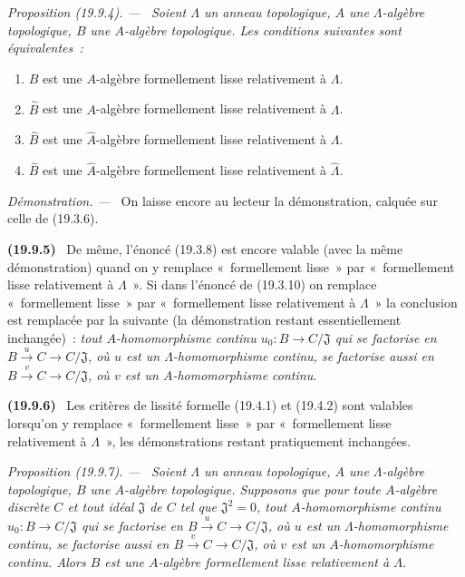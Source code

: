\documentclass[10pt,oneside]{book}
\makeatletter
\newcommand{\setmanualcurrentlabel}[1]{\def\@currentlabel{#1}}
\newcommand{\oldpage}[2][]{%
  \setcounter{footnote}{0}%
  \marginpar{\scriptsize\textbf{#1}~|~#2}\ignorespaces}
\newenvironment{env}[1][]{\setmanualcurrentlabel{#1}\par\medskip\noindent\textbf{(#1)}\ }{\par}
\newenvironment{proposition}[1][]{%
  \setmanualcurrentlabel{#1}\par\medskip\noindent\itshape Proposition (#1). ---\ }{\par}
\newenvironment{proof}{%
  \par\medskip\noindent\textit{Démonstration. ---\ }}{\par}
\makeatother
\begin{document}
\begin{proposition}[19.9.4]
\label{0.19.9.4-fr}
Soient $\Lambda$ un anneau topologique, $A$ une $\Lambda$-algèbre topologique,
$B$ une $A$-algèbre topologique. Les conditions suivantes sont équivalentes~:
\begin{enumerate}
  \item[a)] $B$ est une $A$-algèbre formellement lisse relativement à
  $\Lambda$.
  \item[b)] $\widehat B$ est une $A$-algèbre formellement lisse relativement à
  $\Lambda$.
  \item[c)] $\widehat B$ est une $\widehat A$-algèbre formellement lisse
  relativement à $\Lambda$.
  \item[d)] $\widehat B$ est une $\widehat A$-algèbre formellement lisse
  relativement à $\widehat\Lambda$.
\end{enumerate}
\end{proposition}

\begin{proof}
On laisse encore au lecteur la démonstration, calquée sur celle de (19.3.6).
\end{proof}

\oldpage[0\textsubscript{IV-1}]{115}

\begin{env}[19.9.5]
\label{0.19.9.5-fr}
De même, l'énoncé (19.3.8) est encore valable (avec la même démonstration) quand
on y remplace «~formellement lisse~» par «~formellement lisse relativement à
$\Lambda$~». Si dans l'énoncé de (19.3.10) on remplace «~formellement lisse~»
par «~formellement lisse relativement à $\Lambda$~» la conclusion est remplacée
par la suivante (la démonstration restant essentiellement inchangée)~: \emph{tout
$A$-homomorphisme continu $u_0:B\to C/\mathfrak J$ qui se factorise en
$B\xrightarrow{u}C\to C/\mathfrak J$, où $u$ est un $\Lambda$-homomorphisme
continu, se factorise aussi en $B\xrightarrow{v}C\to C/\mathfrak J$, où $v$
est un $A$-homomorphisme continu}.
\end{env}

\begin{env}[19.9.6]
\label{0.19.9.6-fr}
Les critères de lissité formelle (19.4.1) et (19.4.2) sont valables lorsqu'on y
remplace «~formellement lisse~» par «~formellement lisse relativement à
$\Lambda$~», les démonstrations restant pratiquement inchangées.
\end{env}

\begin{proposition}[19.9.7]
\label{0.19.9.7-fr}
Soient $\Lambda$ un anneau topologique, $A$ une $\Lambda$-algèbre topologique,
$B$ une $A$-algèbre topologique. Supposons que pour toute $A$-algèbre discrète
$C$ et tout idéal $\mathfrak J$ de $C$ tel que $\mathfrak J^2=0$, tout
$A$-homomorphisme continu $u_0:B\to C/\mathfrak J$ qui se factorise en
$B\xrightarrow{u}C\to C/\mathfrak J$, où $u$ est un $\Lambda$-homomorphisme
continu, se factorise aussi en $B\xrightarrow{v}C\to C/\mathfrak J$, où $v$
est un $A$-homomorphisme continu. Alors $B$ est une $A$-algèbre formellement
lisse relativement à $\Lambda$.
\end{proposition}
\end{document}
